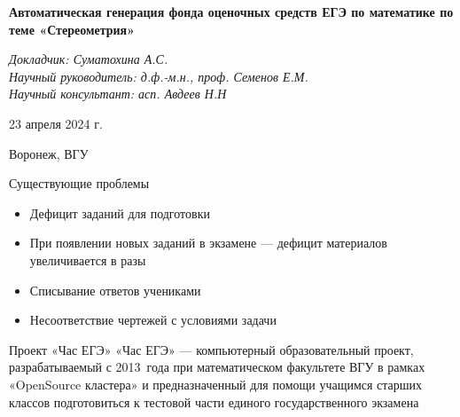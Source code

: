 \documentclass[aspectratio=169,12pt]{beamer}
\begin{document}
\begin{frame}
	\begin{center}
		\vspace{1cm}
		\Large\textcolor{NordBrightBlue}{\textbf{Автоматическая генерация фонда оценочных средств ЕГЭ по математике по теме «Стереометрия»}}\\
	\end{center}
	\vspace{0.5cm}
	\large\textcolor{NordBlue}{\textit{Докладчик: Суматохина А.С.}}\\
	\large\textcolor{NordBlue}{\textit{Научный руководитель: д.ф.-м.н., проф. Семенов Е.М.}}\\
	\large\textcolor{NordBlue}{\textit{Научный консультант: асп. Авдеев Н.Н}}\\
	\vspace{0.5cm}
	\begin{center}
		23 апреля 2024 г.
	\end{center}
	\begin{center}
		Воронеж, ВГУ
	\end{center}

\end{frame}

\begin{frame}{Существующие проблемы}
	\begin{itemize}
		\item Дефицит заданий для подготовки
		\item При появлении новых заданий в экзамене — дефицит материалов увеличивается в разы
		\item Списывание ответов учениками
		\item Несоответствие чертежей с условиями задачи
	\end{itemize}
\end{frame}

\begin{frame}{Проект «Час ЕГЭ»}
	\large
	«Час ЕГЭ» — компьютерный образовательный проект, разрабатываемый с 2013~года при математическом факультете ВГУ в рамках «OpenSource кластера» и предназначенный для помощи учащимся старших классов подготовиться к тестовой части единого государственного экзамена
\end{frame}
\end{document}
